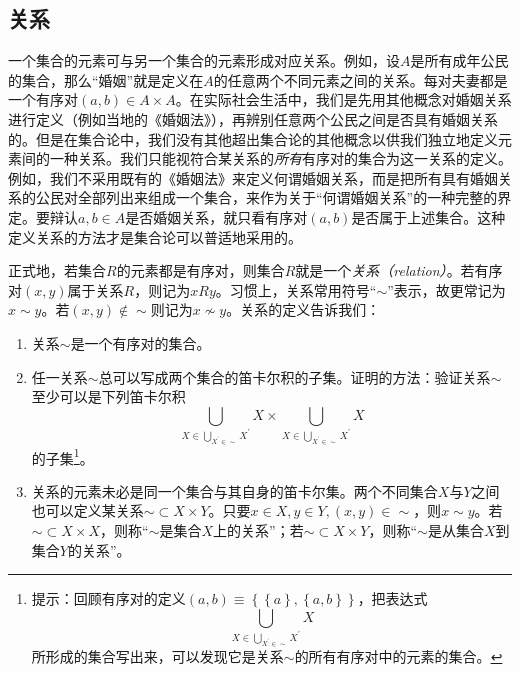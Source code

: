 \documentclass[../main.tex]{subfiles}
\begin{document}
\subsection{关系}
一个集合的元素可与另一个集合的元素形成对应关系。例如，设$A$是所有成年公民的集合，那么“婚姻”就是定义在$A$的任意两个不同元素之间的关系。每对夫妻都是一个有序对$\left(a,b\right)\in A\times A$。在实际社会生活中，我们是先用其他概念对婚姻关系进行定义（例如当地的《婚姻法》），再辨别任意两个公民之间是否具有婚姻关系的。但是在集合论中，我们没有其他超出集合论的其他概念以供我们独立地定义元素间的一种关系。我们只能视符合某关系的\emph{所有}有序对的集合为这一关系的定义。例如，我们不采用既有的《婚姻法》来定义何谓婚姻关系，而是把所有具有婚姻关系的公民对全部列出来组成一个集合，来作为关于“何谓婚姻关系”的一种完整的界定。要辩认$a, b\in A$是否婚姻关系，就只看有序对$\left(a,b\right)$是否属于上述集合。这种定义关系的方法才是集合论可以普适地采用的。

正式地，若集合$R$的元素都是有序对，则集合$R$就是一个\emph{关系（relation）}。若有序对$\left(x,y\right)$属于关系$R$，则记为$xRy$。习惯上，关系常用符号“$\sim$”表示，故更常记为$x\sim y$。若$\left(x,y\right)\notin\sim$则记为$x\not\sim y$。关系的定义告诉我们：

\begin{enumerate}
    \item 关系$\sim$是一个有序对的集合。
    \item 任一关系$\sim$总可以写成两个集合的笛卡尔积的子集。证明的方法：验证关系$\sim$至少可以是下列笛卡尔积
    \[
    \bigcup_{X\in\bigcup_{X^\prime\in\sim}X^\prime}X \times\bigcup_{X\in\bigcup_{X^\prime\in\sim}X^\prime}X
    \]
    的子集\footnote{提示：回顾有序对的定义$\left(a,b\right)\equiv\left\{\left\{a\right\},\left\{a,b\right\}\right\}$，把表达式
    \[
        \bigcup_{X\in\bigcup_{X^\prime\in\sim}X^\prime}X
    \]
    所形成的集合写出来，可以发现它是关系$\sim$的所有有序对中的元素的集合。}。
    \item 关系的元素未必是同一个集合与其自身的笛卡尔集。两个不同集合$X$与$Y$之间也可以定义某关系$\sim\subset X\times Y$。只要$x\in X,y\in Y,\left(x,y\right)\in\sim$，则$x\sim y$。若$\sim\subset X\times X$，则称“$\sim$是集合$X$上的关系”；若$\sim\subset X\times Y$，则称“$\sim$是从集合$X$到集合$Y$的关系”。
\end{enumerate}
\end{document}
